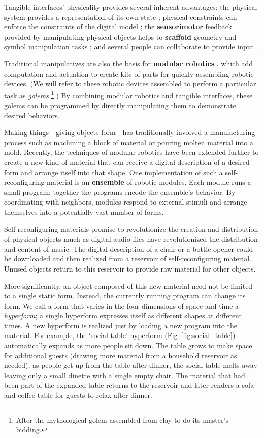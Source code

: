Tangible interfaces' physicality provides several inherent advantages: the physical system provides a representation of its own state \citep{jacob_chi2008}; physical constraints can enforce the constraints of the digital model \citep{patten_chi2007}; the \textbf{sensorimotor} feedback provided by manipulating physical objects helps to \textbf{scaffold} geometry and symbol manipulation tasks \citep{nesta_tangible_learning}; and several people can collaborate to provide input \citep{handsaw,algoblock}.

Traditional manipulatives are also the basis for \textbf{modular robotics} \citep{yim_ra2007}, which add computation and actuation to create kits of parts for quickly assembling robotic devices. 
(We will refer to these robotic devices assembled to perform a particular task as \emph{golems}%
\footnote{After the mythological golem assembled from clay to do its master's bidding.}.) 
By combining modular robotics and tangible interfaces, these golems can be programmed by directly manipulating them to demonstrate desired behaviors.

Making things---giving objects form---has traditionally involved a manufacturing process such as machining a block of material or pouring molten material into a mold. 
Recently, the techniques of modular robotics have been extended further to create a new kind of material that can receive a digital description of a desired form and arrange itself into that shape. 
One implementation of such a self{}-reconfiguring material is an \textbf{ensemble} of robotic modules. 
Each module runs a small program; together the programs encode the ensemble's behavior. 
By coordinating with neighbors, modules respond to external stimuli and arrange themselves into a potentially vast number of forms.

Self{}-reconfiguring materials promise to revolutionize the creation and distribution of physical objects much as digital audio files have revolutionized the distribution and content of music. 
The digital description of a chair or a bottle opener could be downloaded and then realized from a reservoir of self{}-reconfiguring material. 
Unused objects return to this reservoir to provide raw material for other objects.

More significantly, an object composed of this new material need not be limited to a single static form. 
Instead, the currently running program can change its form. 
We call a form that varies in the four dimensions of space and time a \emph{hyperform}; a single hyperform expresses itself as different shapes at different times.  
A new hyperform is realized just by loading a new program into the material. 
For example, the `social table' hyperform (Fig~\ref{fig:social_table}) automatically expands as more people sit down. 
The table grows to make space for additional guests (drawing more material from a household reservoir as needed); as people get up from the table after dinner, the social table melts away leaving only a small dinette with a single empty chair. 
The material that had been part of the expanded table returns to the reservoir and later renders a sofa and coffee table for guests to relax after dinner.


